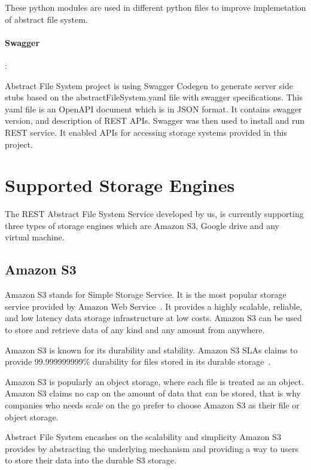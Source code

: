 These python modules are used in different python files to improve 
implemetation of abstract file system.

\paragraph{Swagger}:

Abstract File System project is using Swagger Codegen 
to generate server side stubs based on the 
abstractFileSystem.yaml file with swagger specifications. 
This yaml file is an OpenAPI document which is in JSON format. 
It contains swagger version, and description of REST APIs. 
Swagger was then used to install and run REST service. It enabled 
APIs for accessing storage systems provided in this project.



\section{Supported Storage Engines}

The REST Abstract File System Service developed by us, is currently
supporting three types of storage engines which are Amazon S3, Google
drive and any virtual machine.

\subsection{Amazon S3}

Amazon S3 stands for Simple Storage Service. It is the most popular storage
service provided by Amazon Web Service~\cite{hid-sp18-420-amazon-S3}. It 
provides a highly scalable,
reliable, and low latency data storage infrastructure at low costs. Amazon S3
can be used to store and retrieve data of any kind and any amount from 
anywhere.


Amazon S3 is known for its durability and stability. Amazon S3 SLAs claims to
provide 99.999999999\% durability for files stored in its durable 
storage~\cite{hid-sp18-420-amazon-S3}.


Amazon S3 is popularly an object storage, where each file is treated as an
object. Amazon S3 claims no cap on the amount of data that can be stored, that
is why companies who needs scale on the go prefer to choose Amazon S3 as their
file or object storage.


Abstract File System encashes on the scalability and simplicity Amazon S3
provides by abstracting the underlying mechanism and providing a way to users
to store their data into the durable S3 storage.

